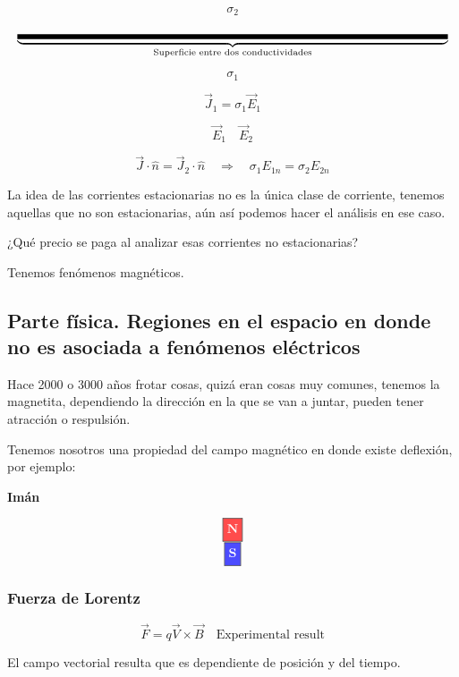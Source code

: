 \documentclass{article}
\begin{document}
\[\sigma_{2}\]

\[\underbrace{\noindent\rule{\textwidth}{4pt}}_{\text{Superficie entre dos conductividades}}\]

\[\sigma_{1}\]

\[ \vec{J}_{1} = \sigma_{1}\vec{E}_{1}  \]


\[ \vec{E}_{1} \quad \vec{E}_{2} \]


\[ \vec{J}\cdot \hat{n} = \vec{J}_{2}\cdot \hat{n} \quad \Rightarrow \quad \boxed{  \sigma_{1} E_{1n} = \sigma_{2}E_{2n} } \]

 
La idea de las corrientes estacionarias no es la única clase de corriente, tenemos aquellas que no son estacionarias, aún así podemos hacer el análisis en ese caso. 

¿Qué precio se paga al analizar esas corrientes no estacionarias?


Tenemos fenómenos magnéticos. 


\subsection{Parte física. Regiones en el espacio en donde no es asociada a fenómenos eléctricos}


Hace 2000 o 3000 años frotar cosas, quizá eran cosas muy comunes, tenemos la magnetita, dependiendo la dirección en la que se van a juntar, pueden tener atracción o respulsión.

Tenemos nosotros una propiedad del campo magnético en donde existe deflexión, por ejemplo:


\textbf{Imán}



\[
\begin{array}{c}
\fcolorbox{black}{red!70}{\strut\textcolor{white}{\bfseries N}}\\[4pt]
\fcolorbox{black}{blue!70}{\strut\textcolor{white}{\bfseries S}}
\end{array}
\]



\subsubsection{Fuerza de Lorentz}




\[  \vec{F} = q\vec{V} \times \vec{B} \quad \text{Experimental result}   \]


El campo vectorial resulta que es dependiente de posición y del tiempo.
\end{document}
